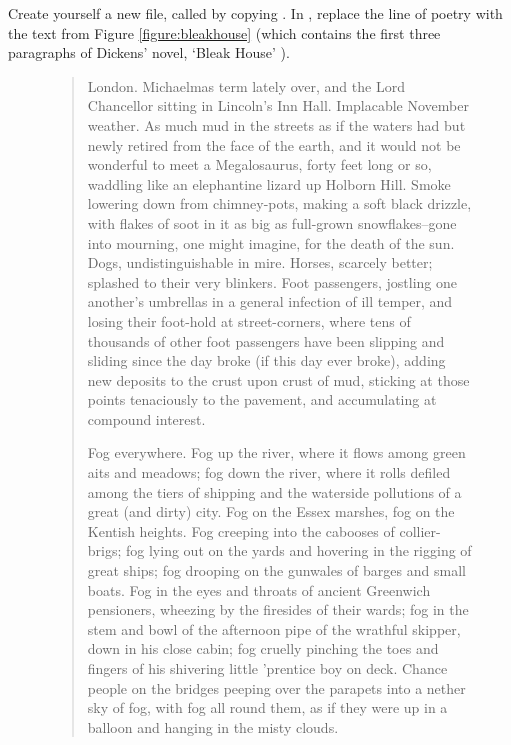 \begin{refsection}
\label{sec:exercise-2}

 Create yourself a new file, called  by copying . In , replace the line of poetry with the text from Figure \ref{figure:bleakhouse} (which contains the first three paragraphs of Dickens' novel, `Bleak House' \citep{dickens1852}).

\begin{figure}[tbp]

\begin{quote}

  \itshape
  \raggedright
  
London. Michaelmas term lately over, and the Lord Chancellor sitting
in Lincoln's Inn Hall. Implacable November weather. As much mud in
the streets as if the waters had but newly retired from the face of
the earth, and it would not be wonderful to meet a Megalosaurus,
forty feet long or so, waddling like an elephantine lizard up Holborn
Hill. Smoke lowering down from chimney-pots, making a soft black
drizzle, with flakes of soot in it as big as full-grown
snowflakes--gone into mourning, one might imagine, for the death of
the sun. Dogs, undistinguishable in mire. Horses, scarcely better;
splashed to their very blinkers. Foot passengers, jostling one
another's umbrellas in a general infection of ill temper, and losing
their foot-hold at street-corners, where tens of thousands of other
foot passengers have been slipping and sliding since the day broke
(if this day ever broke), adding new deposits to the crust upon crust
of mud, sticking at those points tenaciously to the pavement, and
accumulating at compound interest.



Fog everywhere. Fog up the river, where it flows among green aits and
meadows; fog down the river, where it rolls defiled among the tiers
of shipping and the waterside pollutions of a great (and dirty) city.
Fog on the Essex marshes, fog on the Kentish heights. Fog creeping
into the cabooses of collier-brigs; fog lying out on the yards and
hovering in the rigging of great ships; fog drooping on the gunwales
of barges and small boats. Fog in the eyes and throats of ancient
Greenwich pensioners, wheezing by the firesides of their wards; fog
in the stem and bowl of the afternoon pipe of the wrathful skipper,
down in his close cabin; fog cruelly pinching the toes and fingers of
his shivering little 'prentice boy on deck. Chance people on the
bridges peeping over the parapets into a nether sky of fog, with fog
all round them, as if they were up in a balloon and hanging in the
misty clouds.


\end{quote}
\end{figure}
\end{refsection}
